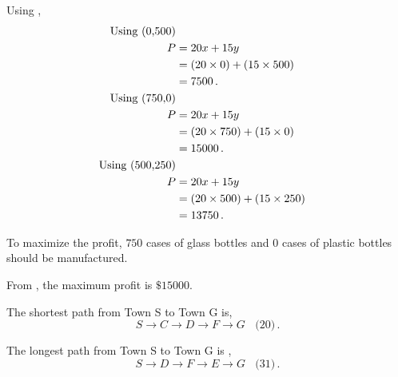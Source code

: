 \begin{subquestions}
\begin{subsubquestions}
\begin{subsubsubquestions}
\subsubsubquestion

Using ,
\begin{align}
	\text{Using (0,500)} \nonumber \\
	P & = 20x + 15y \nonumber \\
	  & = (20 \times 0) + (15 \times 500) \nonumber \\
	  & = 7500\,. \\
	\text{Using (750,0)} \nonumber \\
	P & = 20x + 15y\nonumber \\
	  & = (20 \times 750) + (15 \times 0) \nonumber \\
	  & = 15000\,. \label{2015:q1:eqn:Profit} \\	  
	\text{Using (500,250)} \nonumber \\
	P & = 20x + 15y \nonumber \\
	  & = (20 \times 500) + (15 \times250) \nonumber \\
	  & = 13750\,.
\end{align}

To maximize the profit, $750$ cases of glass bottles and $0$ cases of plastic bottles should be manufactured.


\subsubsubquestion

From , the maximum profit is $\$ 15000$.

\end{subsubsubquestions}

\end{subsubquestions}


\subquestion

The shortest path from Town S to Town G is,
\begin{equation}
	S \rightarrow C \rightarrow D \rightarrow F \rightarrow G ~~~~\text{(20)} \,.
\end{equation}

The longest path from Town S to Town G is ,
\begin{equation}
	S \rightarrow D \rightarrow F \rightarrow E \rightarrow G ~~~~\text{(31)} \,.
\end{equation}

\end{subquestions}

